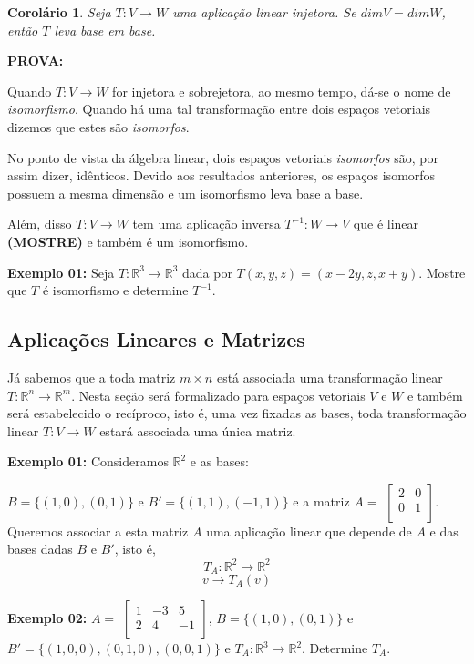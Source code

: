 \documentclass[oneside,a4paper,12pt]{article}
\newtheorem{corollary}{Corolário}[section]
\begin{document}
\begin{corollary}
	Seja $T:V \rightarrow W$ uma aplicação linear injetora. Se $dimV = dimW$, então $T$ leva base em base.
\end{corollary}
{\bf PROVA:}
\vspace{200pt}

Quando $T: V \rightarrow W$ for injetora e sobrejetora, ao mesmo tempo, dá-se o nome de \emph{isomorfismo}. Quando há uma tal transformação entre dois espaços vetoriais dizemos que estes são \emph{isomorfos}. 

No ponto de vista da álgebra linear, dois espaços vetoriais \emph{isomorfos} são, por assim dizer, idênticos. Devido aos resultados anteriores, os espaços isomorfos possuem a mesma dimensão e um isomorfismo leva base a base.

Além, disso $T: V \rightarrow W$ tem uma aplicação inversa $T^{-1}:W \rightarrow V$ que é linear {\bf (MOSTRE)} e também é um isomorfismo.

{\bf Exemplo 01: } Seja $T: \mathbb{R}^{3} \rightarrow \mathbb{R}^{3}$ dada por $T(x,y,z) = (x - 2y,z, x+y)$. Mostre que $T$ é isomorfismo e determine $T^{-1}$.
\vspace{250pt}

\subsection{Aplicações Lineares e Matrizes}

Já sabemos que a toda matriz $m \times n$ está associada uma transformação linear $T:\mathbb{R}^n \rightarrow \mathbb{R}^m$. Nesta seção será formalizado para espaços vetoriais $V$ e $W$ e também será estabelecido o recíproco, isto é, uma vez fixadas as bases, toda transformação linear $T: V \rightarrow W$ estará associada uma única matriz.

{\bf Exemplo 01:} Consideramos $\mathbb{R}^2$ e as bases:

$B = \{ (1,0),(0,1) \}$ e $B' = \{ (1,1), (-1,1) \}$ e a matriz $A = $ $\left[
\begin{array}{cc}
2	&	0	\\
0	&	1	\\
\end{array}
\right]  $. Queremos associar a esta matriz $A$ uma aplicação linear que depende de $A$ e das bases dadas $B$ e $B'$, isto é,
$$T_A : \mathbb{R}^2 \rightarrow \mathbb{R}^2$$
$$v \rightarrow T_A (v)$$

\newpage

{\bf Exemplo 02: } $A = $ $\left[
\begin{array}{ccc}
1	&	-3	&	5 \\
2	&	4	&	-1	\\
\end{array}
\right]$, $B = \{ (1,0), (0,1) \}$ e $B' = \{ (1,0,0), (0,1,0), (0,0,1) \}$ e $T_A : \mathbb{R}^3 \rightarrow \mathbb{R}^2$. Determine $T_A$.
\vspace{150pt}
\end{document}
